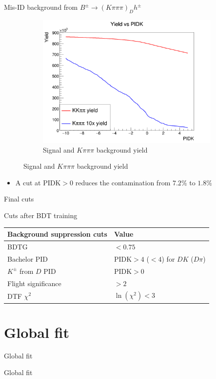 \documentclass{beamer}
\begin{document}
\begin{frame}{Mis-ID background from \texorpdfstring{$B^\pm\to(K\pi\pi\pi)_Dh^\pm$}{B to K pi pi pi h}}
\begin{figure}
\begin{subfigure}{0.5\textwidth}
      \includegraphics[width = 1.0\textwidth]{Plots/YieldVSPIDK.png}
      \caption{Signal and $K\pi\pi\pi$ background yield}
    \end{subfigure}
  \end{figure}
  \begin{itemize}
    \item{A cut at $\text{PIDK} > 0$ reduces the contamination from $7.2\%$ to $1.8\%$}
  \end{itemize}
\end{frame}

\begin{frame}{Final cuts}
  \begin{center}
    Cuts after BDT training
  \end{center}
  \centering
  \def\arraystretch{1.2}%
  \begin{tabular}{|l|l|}
    \hline
    Background suppression cuts & Value \\
    \hline
    BDTG                        & $< 0.75$ \\
    Bachelor PID                & $\text{PIDK} > 4$ ($< 4$) for $DK$ ($D\pi$) \\
    $K^\pm$ from $D$ PID        & $\text{PIDK} > 0$ \\
    Flight significance         & $ > 2$ \\
    DTF $\chi^2$                & $\ln(\chi^2) < 3$ \\
    \hline
  \end{tabular}
\end{frame}

\section{Global fit}
\begin{frame}{Global fit}
  \begin{center}
    {\huge Global fit}
  \end{center}
\end{frame}
\end{document}
